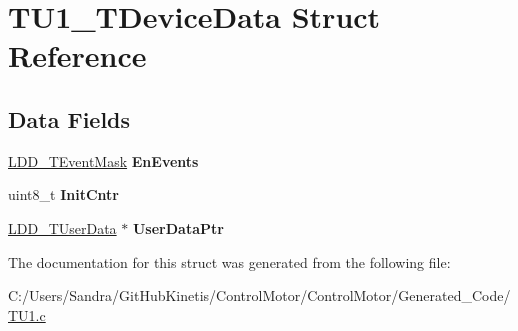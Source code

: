 \hypertarget{struct_t_u1___t_device_data}{}\section{T\+U1\+\_\+\+T\+Device\+Data Struct Reference}
\label{struct_t_u1___t_device_data}
\subsection*{Data Fields}
\begin{DoxyCompactItemize}
\item 
\hyperlink{group___p_e___types__module_gafbe7f4d4e51560399c3bdd0218584533}{L\+D\+D\+\_\+\+T\+Event\+Mask} {\bfseries En\+Events}\hypertarget{struct_t_u1___t_device_data_ac694558cfbb7871707f2b4fa50636e83}{}\label{struct_t_u1___t_device_data_ac694558cfbb7871707f2b4fa50636e83}

\item 
uint8\+\_\+t {\bfseries Init\+Cntr}\hypertarget{struct_t_u1___t_device_data_a6f7812497a6a66d8ce0baace72a4a0c6}{}\label{struct_t_u1___t_device_data_a6f7812497a6a66d8ce0baace72a4a0c6}

\item 
\hyperlink{group___p_e___types__module_ga0b66a73f87238a782318aa0be7578e35}{L\+D\+D\+\_\+\+T\+User\+Data} $\ast$ {\bfseries User\+Data\+Ptr}\hypertarget{struct_t_u1___t_device_data_a3998052c6674b750711c4ce24df0a417}{}\label{struct_t_u1___t_device_data_a3998052c6674b750711c4ce24df0a417}

\end{DoxyCompactItemize}


The documentation for this struct was generated from the following file\+:\begin{DoxyCompactItemize}
\item 
C\+:/\+Users/\+Sandra/\+Git\+Hub\+Kinetis/\+Control\+Motor/\+Control\+Motor/\+Generated\+\_\+\+Code/\hyperlink{_t_u1_8c}{T\+U1.\+c}\end{DoxyCompactItemize}
